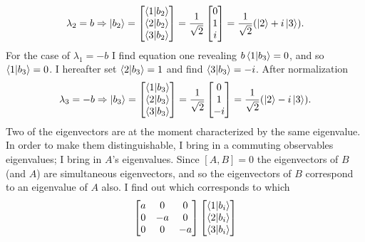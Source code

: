 \begin{example}
\begin{enumerate}
\begin{equation}
			\lambda_2=b\Rightarrow
			\ket{b_2}=\begin{bmatrix}
				\braket{1|b_2}\\
				\braket{2|b_2}\\
				\braket{3|b_2}\\
			\end{bmatrix}=\frac{1}{\sqrt{2}}\begin{bmatrix}
				0\\
				1\\
				i\\
			\end{bmatrix}=\frac{1}{\sqrt{2}}(\ket{2}+i\ket{3}).
		\end{equation} 
		For the case of $\lambda_1=-b$ I find equation one revealing $b\braket{1|b_3}=0$, and so $\braket{1|b_3}=0$. I hereafter set $\braket{2|b_3}=1$ and find $\braket{3|b_3}=-i$. After normalization
		\begin{equation}
			\lambda_3=-b\Rightarrow
			\ket{b_3}=\begin{bmatrix}
				\braket{1|b_3}\\
				\braket{2|b_3}\\
				\braket{3|b_3}\\
			\end{bmatrix}=\frac{1}{\sqrt{2}}\begin{bmatrix}
				0\\
				1\\
				-i\\
			\end{bmatrix}=\frac{1}{\sqrt{2}}(\ket{2}-i\ket{3}).
		\end{equation} 
		Two of the eigenvectors are at the moment characterized by the same eigenvalue. In order to make them distinguishable, I bring in a commuting observables eigenvalues; I bring in $A$'s eigenvalues. Since $[A,B]=0$ the eigenvectors of $B$ (and $A$) are simultaneous eigenvectors, and so the eigenvectors of $B$ correspond to an eigenvalue of $A$ also. I find out which corresponds to which
		\begin{equation}
			\begin{bmatrix}
				a & 0 & 0 \\
				0 & -a & 0\\
				0 & 0 & -a \\
			\end{bmatrix}
			\begin{bmatrix}
				\braket{1|b_i}\\
				\braket{2|b_i}\\
				\braket{3|b_i}\\

\end{bmatrix}
\end{equation}
\end{enumerate}
\end{example}
